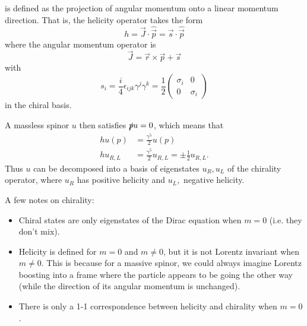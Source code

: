 is defined as the projection of angular momentum onto a linear momentum direction. That is, the helicity operator takes the form
\begin{equation}
    h=\vec J \cdot \hat {\vec p} = \vec s \cdot \hat {\vec p}
\end{equation}
where the angular momentum operator is 
\begin{equation}
    \vec J = \vec r \times \vec p + \vec s
\end{equation}
with
\begin{equation}
    s_i = \frac{i}{4} \epsilon_{ijk}\gamma^j \gamma^k
    =\frac{1}{2} \begin{pmatrix}
    \sigma_i & 0\\
    0 & \sigma_i
    \end{pmatrix}
\end{equation}
in the chiral basis.

A massless spinor $u$ then satisfies $\slashed{p}u=0$, which means that
\begin{align*}
    h u(p) &= \frac{\gamma^5}{2} u(p)\\
    h u_{R,L} &=\frac{\gamma^5}{2} u_{R,L}= \pm\frac{1}{2} u_{R,L}.
\end{align*}
Thus $u$ can be decomposed into a basis of eigenstates $u_R,u_L$ of the chirality operator, where $u_R$ has positive helicity and $u_L,$ negative helicity.

A few notes on chirality:
\begin{itemize}
    \item Chiral states are only eigenstates of the Dirac equation when $m=0$ (i.e. they don't mix).
    \item Helicity is defined for $m=0$ and $m\neq 0$, but it is not Lorentz invariant when $m\neq 0$. This is because for a massive spinor, we could always imagine Lorentz boosting into a frame where the particle appears to be going the other way (while the direction of its angular momentum is unchanged).
    \item There is only a 1-1 correspondence between helicity and chirality when $m=0$.
\end{itemize}

